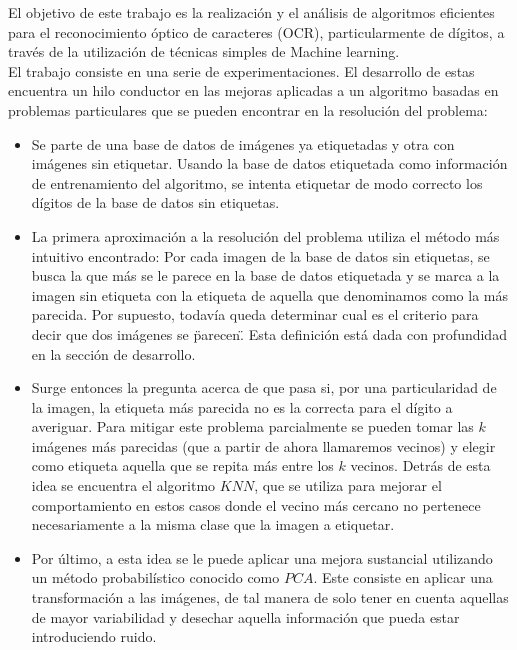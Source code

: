 El objetivo de este trabajo es la realización y el análisis de algoritmos eficientes para el reconocimiento óptico de caracteres (OCR), particularmente de dígitos,  a través de la utilización de técnicas simples de Machine learning.
\\
El trabajo consiste en una serie de experimentaciones. El desarrollo de estas encuentra un hilo conductor en las mejoras aplicadas a un algoritmo basadas en problemas particulares que se pueden encontrar en la resolución del problema: 

\begin{itemize}

  \item Se parte de una base de datos de imágenes ya etiquetadas y otra con imágenes sin etiquetar. Usando la base de datos etiquetada como información de entrenamiento del algoritmo, se intenta etiquetar de modo correcto los dígitos de la base de datos sin etiquetas.

  \item La primera aproximación a la resolución del problema utiliza el método más intuitivo encontrado: Por cada imagen de la base de datos sin etiquetas, se busca la que más se le parece en la base de datos etiquetada y se marca a la imagen sin etiqueta con la etiqueta de aquella que denominamos como la más parecida. Por supuesto, todavía queda determinar cual es el criterio para decir que dos imágenes se \"parecen\". Esta definición está dada con profundidad en la sección de desarrollo.

  \item Surge entonces la pregunta acerca de que pasa si, por una particularidad de la imagen, la etiqueta más parecida no es la correcta para el dígito a averiguar. Para mitigar este problema parcialmente se pueden tomar las $k$ imágenes más parecidas (que a partir de ahora llamaremos vecinos) y elegir como etiqueta aquella que se repita más entre los $k$ vecinos. Detrás de esta idea se encuentra el algoritmo $KNN$, que se utiliza para mejorar el comportamiento en estos casos donde el vecino más cercano no pertenece necesariamente a la misma clase que la imagen a etiquetar.

  \item Por último, a esta idea se le puede aplicar una mejora sustancial utilizando un método probabilístico conocido como $PCA$. Este consiste en aplicar una transformación a las imágenes, de tal manera de solo tener en cuenta aquellas de mayor variabilidad y desechar aquella información que pueda estar introduciendo ruido.

\end{itemize}

